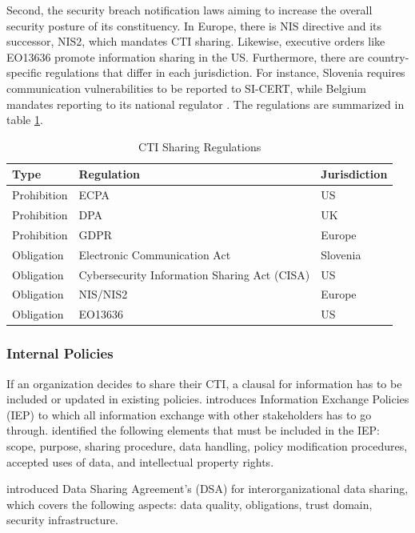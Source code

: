 Second, the security breach notification laws aiming to increase the overall security posture of its constituency. In Europe, there is NIS directive and its successor, NIS2, which mandates CTI sharing. Likewise, executive orders like EO13636 promote information sharing in the US. Furthermore, there are country-specific regulations that differ in each jurisdiction. For instance, Slovenia requires communication vulnerabilities to be reported to SI-CERT, while Belgium mandates reporting to its national regulator \cite{wagner_cyber_2019}. The regulations are summarized in table \ref{tab:regulations}.

\begin{table}[ht]
    \caption{CTI Sharing Regulations \cite{wagner_cyber_2019}}
    \label{tab:regulations}
    \begin{tabularx}{\textwidth}{XXX}
        \hline
        Type & Regulation & Jurisdiction  \\
        \hline
        \hline
        Prohibition & ECPA & US \\
        Prohibition & DPA & UK \\
        Prohibition & GDPR & Europe \\
        Obligation & Electronic Communication Act & Slovenia \\
        Obligation & Cybersecurity Information Sharing Act (CISA) & US \\
        Obligation & NIS/NIS2 & Europe \\
        Obligation & EO13636 & US \\
    \end{tabularx}
\end{table}


\subsubsection{Internal Policies}
If an organization decides to share their CTI, a clausal for information has
to be included or updated in existing policies.
\cite{dandurand_towards_2013} introduces Information Exchange Policies (IEP) to which all information exchange with other stakeholders has to go through.
\cite{serrano_design_2014} identified the following elements that must be included in the IEP: scope, purpose, sharing procedure, data handling, policy modification procedures, accepted uses of data, and intellectual property rights.

\cite{martinelli_formal_2012} introduced Data Sharing Agreement’s (DSA) for interorganizational data sharing, which covers the following aspects: data quality, obligations, trust domain, security infrastructure.

